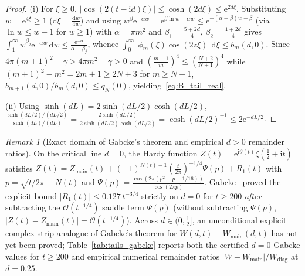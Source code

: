 \documentclass[11pt,reqno]{amsart}
\theoremstyle{definition}
\theoremstyle{remark}
\newtheorem{remark}[theorem]{Remark}
\numberwithin{equation}{section}
\newcommand{\dd}{\mathrm{d}}
\newcommand{\ii}{\mathrm{i}}
\newcommand{\ee}{\mathrm{e}}
\begin{document}
\begin{proof}
(i) For $\xi \ge 0$, $\lvert\cos(2(t - \ii d)\xi)\rvert \le \cosh(2d\xi) \le \ee^{2d\xi}$. Substituting $w = \ee^{4\xi} \ge 1$ ($\dd\xi = \frac{\dd w}{4w}$) and using $w^{\beta}\ee^{-\alpha w} = \ee^{\beta\ln w - \alpha w} \le \ee^{-(\alpha - \beta)w - \beta}$ (via $\ln w \le w - 1$ for $w \ge 1$) with $\alpha = \pi m^2$ and $\beta_1 = \frac{5+2d}{4}$, $\beta_2 = \frac{1+2d}{4}$ gives $\int_1^{\infty} w^{\beta_j}\ee^{-\alpha w}\,\dd w \le \frac{\ee^{-\alpha}}{\alpha - \beta_j}$, whence $\int_0^{\infty} \lvert\phi_m(\xi)\cos(2z\xi)\rvert\,\dd\xi \le b_m(d,0)$. Since $4\pi(m+1)^2 - \gamma > 4\pi m^2 - \gamma > 0$ and $(\frac{m+1}{m})^4 \le (\frac{N+2}{N+1})^4$ while $(m+1)^2 - m^2 = 2m + 1 \ge 2N + 3$ for $m \ge N+1$, $b_{m+1}(d,0)/b_m(d,0) \le q_N(0)$, yielding~\eqref{eq:B_tail_real}.

(ii) Using $\sinh(dL) = 2\sinh(dL/2)\cosh(dL/2)$, $\frac{\sinh(dL/2)/(dL/2)}{\sinh(dL)/(dL)} = \frac{2\sinh(dL/2)}{2\sinh(dL/2)\cosh(dL/2)} = \cosh(dL/2)^{-1} \le 2\ee^{-dL/2}$.
\end{proof}

\begin{remark}[Exact domain of Gabcke's theorem and empirical $d > 0$ remainder ratios]\label{rem:gabcke_scope}
On the critical line $d = 0$, the Hardy function $Z(t) = \ee^{\ii\vartheta(t)}\zeta(\frac{1}{2}+\ii t)$ satisfies $Z(t) = Z_{\mathrm{main}}(t) + (-1)^{N(t)-1}(\frac{t}{2\pi})^{-1/4}\Psi(p) + R_1(t)$ with $p = \sqrt{t/2\pi} - N(t)$ and $\Psi(p) = \frac{\cos(2\pi(p^2 - p - 1/16))}{\cos(2\pi p)}$. Gabcke~\cite[Satz~1 and Satz~4]{gabcke1979} proved the explicit bound $\lvert R_1(t)\rvert \le 0.127\,t^{-3/4}$ strictly on $d = 0$ for $t \ge 200$ \emph{after} subtracting the $\mathcal{O}(t^{-1/4})$ saddle term $\Psi(p)$ (without subtracting $\Psi(p)$, $\lvert Z(t) - Z_{\mathrm{main}}(t)\rvert = \mathcal{O}(t^{-1/4})$). Across $d \in (0, \frac{1}{2}]$, an unconditional explicit complex-strip analogue of Gabcke's theorem for $W(d,t) - W_{\mathrm{main}}(d,t)$ has not yet been proved; Table~\ref{tab:tails_gabcke} reports both the certified $d = 0$ Gabcke values for $t \ge 200$ and empirical numerical remainder ratios $\lvert W - W_{\mathrm{main}}\rvert / W_{\mathrm{diag}}$ at $d = 0.25$.
\end{remark}
\end{document}
